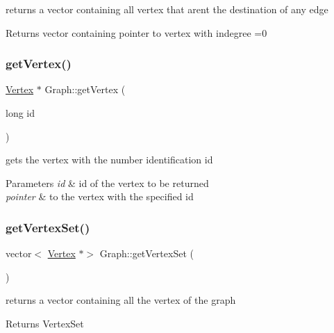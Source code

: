 returns a vector containing all vertex that aren\textquotesingle{}t the destination of any edge 

\begin{DoxyReturn}{Returns}
vector containing pointer to vertex with indegree =0 
\end{DoxyReturn}
\hypertarget{class_graph_a0d47743637a652f8e3ba84f5d83118f3}{}\label{class_graph_a0d47743637a652f8e3ba84f5d83118f3} 
\subsubsection{\texorpdfstring{get\+Vertex()}{getVertex()}}
{\footnotesize\ttfamily \hyperlink{class_vertex}{Vertex} $\ast$ Graph\+::get\+Vertex (\begin{DoxyParamCaption}\item[{long}]{id }\end{DoxyParamCaption})}



gets the vertex with the number identification id 


\begin{DoxyParams}{Parameters}
{\em id} & id of the vertex to be returned\\
\hline
{\em pointer} & to the vertex with the specified id \\
\hline
\end{DoxyParams}
\hypertarget{class_graph_ad9c74e7d666e95408940610429f7a59a}{}\label{class_graph_ad9c74e7d666e95408940610429f7a59a} 
\subsubsection{\texorpdfstring{get\+Vertex\+Set()}{getVertexSet()}}
{\footnotesize\ttfamily vector$<$ \hyperlink{class_vertex}{Vertex} $\ast$$>$ Graph\+::get\+Vertex\+Set (\begin{DoxyParamCaption}{ }\end{DoxyParamCaption})}



returns a vector containing all the vertex of the graph 

\begin{DoxyReturn}{Returns}
Vertex\+Set 
\end{DoxyReturn}
\hypertarget{class_graph_ae87923c630b6fb3d3fa087d5c27ad8ee}{}\label{class_graph_ae87923c630b6fb3d3fa087d5c27ad8ee} 
